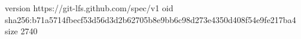 version https://git-lfs.github.com/spec/v1
oid sha256:b71a5714fbecf53d56d3d2b62705b8e9bb6c98d273e4350d408f54e9fe217ba4
size 2740
